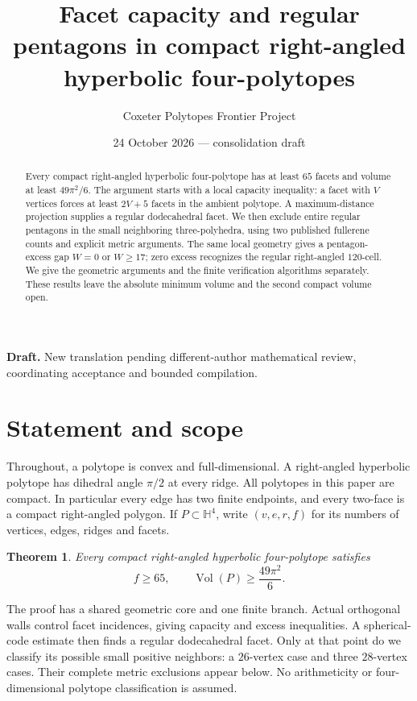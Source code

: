 \documentclass[11pt]{article}
\title{Facet capacity and regular pentagons\linebreak
in compact right-angled hyperbolic four-polytopes}
\author{Coxeter Polytopes Frontier Project}
\date{24 October 2026 --- consolidation draft}
\newtheorem{theorem}{Theorem}
\theoremstyle{remark}
\newcommand{\HH}{\mathbb H}
\newcommand{\Vol}{\operatorname{Vol}}
\begin{document}
\maketitle
\begin{center}\small\textbf{Draft.} New translation pending different-author
mathematical review, coordinating acceptance and bounded compilation.\end{center}

\begin{abstract}
Every compact right-angled hyperbolic four-polytope has at least $65$
facets and volume at least $49\pi^2/6$. The argument starts with a local
capacity inequality: a facet with $V$ vertices forces at least $2V+5$
facets in the ambient polytope. A maximum-distance projection supplies a
regular dodecahedral facet. We then exclude entire regular pentagons in
the small neighboring three-polyhedra, using two published fullerene
counts and explicit metric arguments. The same local geometry gives a
pentagon-excess gap $W=0$ or $W\ge17$; zero excess recognizes the regular
right-angled $120$-cell. We give the geometric arguments and the finite
verification algorithms separately. These results leave the absolute
minimum volume and the second compact volume open.
\end{abstract}

\section{Statement and scope}

Throughout, a polytope is convex and full-dimensional. A right-angled
hyperbolic polytope has dihedral angle $\pi/2$ at every ridge. All
polytopes in this paper are compact. In particular every edge has two
finite endpoints, and every two-face is a compact right-angled polygon.
If $P\subset\HH^4$, write $(v,e,r,f)$ for its numbers of vertices,
edges, ridges and facets.

\begin{theorem}\label{thm:global-lower}
Every compact right-angled hyperbolic four-polytope satisfies
\[
 f\ge65,\qquad \Vol(P)\ge\frac{49\pi^2}{6}.
\]
\end{theorem}

The proof has a shared geometric core and one finite branch. Actual
orthogonal walls control facet incidences, giving capacity and excess
inequalities. A spherical-code estimate then finds a regular dodecahedral
facet. Only at that point do we classify its possible small positive
neighbors: a $26$-vertex case and three $28$-vertex cases. Their complete
metric exclusions appear below. No arithmeticity or four-dimensional
polytope classification is assumed.
\end{document}
